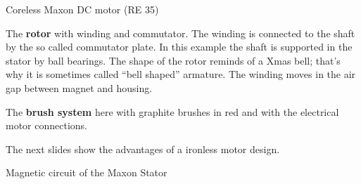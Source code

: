 \documentclass[compress]{beamer}
\begin{document}
\begin{frame}{Coreless Maxon DC motor (RE 35)}
{The \textbf{rotor} with winding and commutator. The winding is connected
to the shaft by the so called commutator plate. In this example the
shaft is supported in the stator by ball bearings. The shape of the
rotor reminds of a Xmas bell; that's why it is sometimes called ``bell
shaped'' armature. The winding moves in the air gap between magnet and
housing.

The \textbf{brush system} here with graphite brushes in red and with the
electrical motor connections.

The next slides show the advantages of a ironless motor design.
}

\end{frame}

\begin{frame}{Magnetic circuit of the Maxon Stator}



\end{frame}
\end{document}
